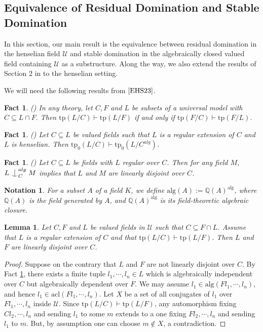 \documentclass[12pt]{article}
\newcommand{\tpp}{\mathrm{tp}}
\newcommand{\acl}{\mathrm{acl}}
\newcommand{\alg}{\mathrm{alg}}
\newcommand{\0}{\emptyset}
\newcommand{\U}{\mathcal{U}}
\def\forkindep{\mathrel{\raise0.2ex\hbox{\ooalign{\hidewidth$\vert$\hidewidth\cr\raise-0.9ex\hbox{$\smile$}}}}}
\theoremstyle{plain}%
\newtheorem{lem}[thm]{Lemma}
\newtheorem{fact}[thm]{Fact}
\newtheorem{notation}[thm]{Notation}
\theoremstyle{definition}
\theoremstyle{remark}
\begin{document}
\subsection{Equivalence of Residual Domination and Stable Domination}

 In this section, our main result is the equivalence between residual domination in the henselian field $\U$ and stable domination in the algebraically closed valued field containing $\U$ as a substructure. Along the way, we also extend the results of Section 2 in \cite{EHS23} to the henselian setting. 
 
 We will need the following results from $\cite{EHS23}$.
 
\begin{fact}\label{type_implications}(\cite[Lemma 1.13]{EHS23}) In any theory, let $C, F$ and $L$ be subsets of a universal model with $C\subseteq L \cap F.$ Then $\tpp(L/C)\vdash\tpp(L/F)$ if and only if $\tpp(F/C)\vdash \tpp(F/L)$.
\end{fact}


\begin{fact}\label{type_implications2}(\cite[Lemma 1.19]{EHS23})
 Let $C\subseteq L$ be valued fields such that $L$ is a regular extension of $C$ and $L$ is henselian. Then $\tpp_0(L/C)\vdash \tpp_0(L/C^{alg})$.
\end{fact}

\begin{fact}\label{regularity}(\cite[VIII, 4.12]{La02})
Let $C\subseteq L$ be fields with $L$ regular over $C$. Then for any field $M$, $L\forkindep_{C}^{alg} M$ implies that $L$ and $M$ are linearly disjoint over $C$. 
\end{fact}
\begin{notation}
    For a subset $A$ of a field $K$, we define $\alg(A):=\mathbb{Q}(A)^{\alg}$, where $\mathbb{Q}(A)$ is the field generated by $A$, and $\mathbb{Q}(A)^{\alg}$ is its field-theoretic algebraic closure.
\end{notation} 
 \begin{lem}\label{linear_disjoint} Let $C,F$ and $L$ be valued fields in $\U$ such that $C\subseteq F\cap L$. Assume that $L$ is a regular extension of $C$ and that $\tpp(L/C)\vdash \tpp(L/F)$. Then $L$ and $F$ are linearly disjoint over $C$.
\end{lem}
\begin{proof}
Suppose on the contrary that $L$ and $F$ are not linearly disjoint over $C$. By Fact \ref{regularity}, there exists a finite tuple $l_1,\cdots, l_n\in L$ which is algebraically independent over $C$ but algebraically dependent over $F$. We may assume $l_1\in \alg(Fl_1,\cdots, l_n)$, and hence $l_1\in \acl(Fl_1, \cdots, l_n)$. Let $X$ be a set of all conjugates of $l_1$ over $F l_1,\cdots, l_n$ inside $\U$. Since $\tpp(L/C)\vdash\tpp(L/F)$, any automorphism fixing $Cl_2,\cdots, l_n$ and sending $l_1$ to some $m$ extends to a one fixing $Fl_2,\cdots, l_n$ and sending $l_1$ to $m$. But, by assumption one can choose $m\not\in X$, a contradiction. 
\end{proof}
 
\end{document}

